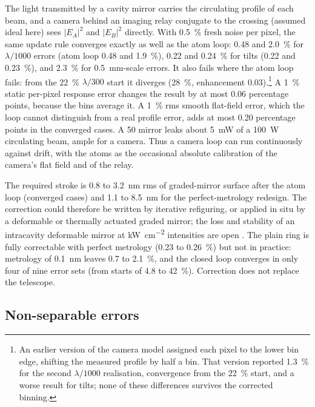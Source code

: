 \documentclass[11pt]{article}
\begin{document}
The light transmitted by a cavity mirror carries the circulating profile of each beam, and a camera
behind an imaging relay conjugate to the crossing (assumed ideal here) sees $|E_A|^{2}$ and
$|E_B|^{2}$ directly. With \SI{0.5}{\percent} fresh noise per pixel, the same update rule converges exactly
as well as the atom loop: 0.48 and \SI{2.0}{\percent} for $\lambda/1000$ errors (atom loop 0.48 and
\SI{1.9}{\percent}), 0.22 and \SI{0.24}{\percent} for tilts (0.22 and \SI{0.23}{\percent}), and
\SI{2.3}{\percent} for \SI{0.5}{\milli\metre}-scale errors. It also fails where the atom loop fails: from the
\SI{22}{\percent} $\lambda/300$ start it diverges (\SI{28}{\percent}, enhancement 0.03).\footnote{An earlier
version of the camera model assigned each pixel to the lower bin edge, shifting the measured profile by half
a bin. That version reported \SI{1.3}{\percent} for the second $\lambda/1000$ realisation, convergence from
the \SI{22}{\percent} start, and a worse result for tilts; none of these differences survives the corrected
binning.} A \SI{1}{\percent} static per-pixel response error changes the result by at most 0.06
percentage points, because the bins average it. A \SI{1}{\percent} rms smooth flat-field error, which the
loop cannot distinguish from a real profile error, adds at most 0.20 percentage points in the converged
cases. A \SI{50}{\ppm} mirror leaks about
\SI{5}{\milli\watt} of a \SI{100}{\watt} circulating beam, ample for a camera. Thus a camera loop can run
continuously against drift, with the atoms as the occasional absolute calibration of the camera's flat
field and of the relay.

The required stroke is 0.8 to \SI{3.2}{\nano\metre} rms of graded-mirror surface after the atom loop
(converged cases) and 1.1 to \SI{8.5}{\nano\metre} for the perfect-metrology redesign. The
correction could therefore be written by iterative refiguring, or applied in situ by a deformable or
thermally actuated graded mirror; the loss and stability of an intracavity deformable mirror at
\si{\kilo\watt\per\centi\metre\squared} intensities are open \placeholder{[VALUE?]}. The plain ring is
fully correctable with perfect metrology (0.23 to \SI{0.26}{\percent}) but not in practice: metrology of
\SI{0.1}{\nano\metre} leaves 0.7 to \SI{2.1}{\percent}, and the closed loop converges in only four of
nine error sets (from starts of 4.8 to \SI{42}{\percent}). Correction does not replace the telescope.

\subsection{Non-separable errors}
\end{document}
